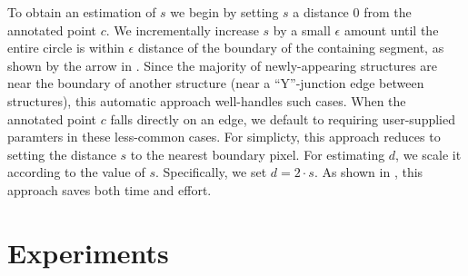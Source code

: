 \documentclass[]{spie}  %
\begin{document}
To obtain an estimation of $s$ we begin by setting $s$ a distance $0$
from the annotated point $c$.  We incrementally increase $s$ by a
small $\epsilon$ amount until the entire circle is within $\epsilon$
distance of the boundary of the containing segment, as shown by the
arrow in .  Since the majority of newly-appearing
structures are near the boundary of another structure (near a
``Y''-junction edge between structures), this automatic approach
well-handles such cases.  When the annotated point $c$ falls directly
on an edge, we default to requiring user-supplied paramters in these
less-common cases.  For simplicty, this approach reduces to setting
the distance $s$ to the nearest boundary pixel.  For estimating $d$,
we scale it according to the value of $s$.  Specifically, we set $d =
2\cdot s$.  As shown in , this approach saves both time and
effort.


\section{Experiments}
\label{sec:ex}

\end{document}
